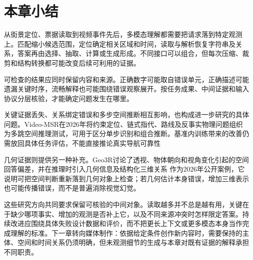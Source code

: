 \section{本章小结}
\label{sec:vision-understanding-summary}

从街景定位、票据读取到视频事件先后，多模态理解都需要把请求落到特定观测上。匹配缩小候选范围，定位确定相关区域和时间，读取与解析恢复字符串及关系，答案再由选择、抽取、计算或生成形成。不同接口可以组合，但每次压缩、裁剪和结构转换都可能改变后续可利用的证据。

可检查的结果应同时保留内容和来源。正确数字可能取自错误单元，正确描述可能遗漏关键时序，流畅解释也可能围绕错误观察展开。按任务成果、中间证据和输入协议分层核验，才能确定问题发生在哪里。

关键证据丢失、关系绑定错误和多步空间推断相互影响，也构成进一步研究的具体问题。Video-MSR在2026年将约束定位、链式指代、路线及反事实物理问题组织为多跳空间推理测试，可用于区分单步识别和组合推断。基准内训练带来的改善仍需放回具体任务评估，不能直接推论真实导航可靠性

几何证据则提供另一种补充。Geo3R讨论了透视、物体朝向和视角变化引起的空间回答偏差，并在推理时引入几何信息及结构化三维关系
作为2026年公开案例，它说明可把空间判断重新落到几何对象上检查；若几何估计本身错误，增加三维表示也可能传播错误，而不是普遍消除视觉幻觉。

这些研究方向共同要求保留可核验的中间对象。读取越多并不总是越有用，关键在于缺少哪项事实、增加的观测是否补上它，以及不同来源冲突时怎样限定答案。持续改进应围绕具体失败设计数据和评价，而不把更长上下文或更多模态本身当作完成理解的标准。下一章转向媒体制作：依据给定条件创作新内容时，需要保持的主体、空间和时间关系仍须明确，但未观测细节的生成与本章对既有证据的解释承担不同职责。
